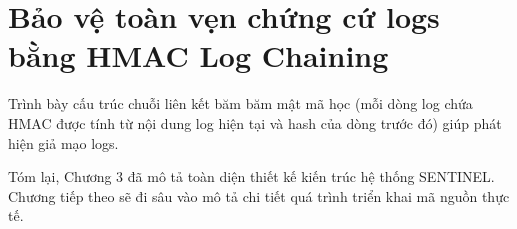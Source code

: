 \section{Bảo vệ toàn vẹn chứng cứ logs bằng HMAC Log Chaining}
Trình bày cấu trúc chuỗi liên kết băm băm mật mã học (mỗi dòng log chứa HMAC được tính từ nội dung log hiện tại và hash của dòng trước đó) giúp phát hiện giả mạo logs.

Tóm lại, Chương 3 đã mô tả toàn diện thiết kế kiến trúc hệ thống SENTINEL. Chương tiếp theo sẽ đi sâu vào mô tả chi tiết quá trình triển khai mã nguồn thực tế.
